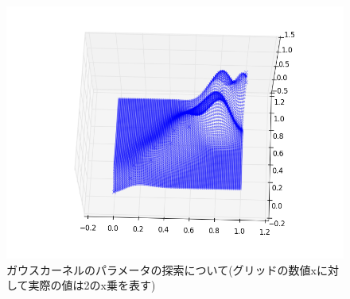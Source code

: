 \documentclass[]{jsarticle}
\begin{document}
\begin{figure}[htbp]
\begin{minipage}[b]{0.5\hsize}
 \end{minipage}
 \begin{minipage}[b]{0.5\hsize}
  \includegraphics[scale=0.4]{./images/gauss_coef.png}
 \end{minipage}
 \caption{ガウスカーネルのパラメータの探索について(グリッドの数値xに対して実際の値は2のx乗を表す)}
\end{figure}
\newpage
\end{document}

